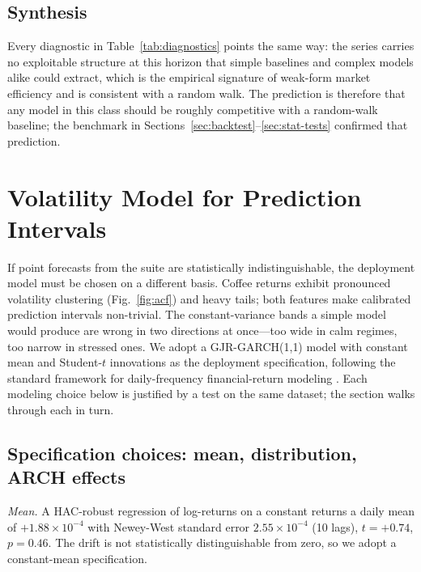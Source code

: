 \documentclass[conference]{IEEEtran}
\begin{document}
\subsection{Synthesis}

Every diagnostic in Table~\ref{tab:diagnostics} points the same way:
the series carries no exploitable structure at this horizon that
simple baselines and complex models alike could extract, which is the
empirical signature of weak-form market efficiency
\cite{fama1970efficient} and is consistent with a random walk. The
prediction is therefore that any model in this class should be
roughly competitive with a random-walk baseline; the benchmark in
Sections~\ref{sec:backtest}--\ref{sec:stat-tests} confirmed that
prediction.

\section{Volatility Model for Prediction Intervals}
\label{sec:garch}

If point forecasts from the suite are statistically indistinguishable,
the deployment model must be chosen on a different basis. Coffee
returns exhibit pronounced volatility clustering (Fig.~\ref{fig:acf})
and heavy tails; both features make calibrated prediction intervals
non-trivial. The constant-variance bands a simple model would produce
are wrong in two directions at once---too wide in calm regimes,
too narrow in stressed ones. We adopt a GJR-GARCH(1{,}1) model with
constant mean and Student-$t$ innovations as the deployment
specification, following the standard framework for daily-frequency
financial-return modeling \cite{tsay2010analysis}. Each modeling
choice below is justified by a test on the same dataset; the section
walks through each in turn.

\subsection{Specification choices: mean, distribution, ARCH effects}

\emph{Mean.} A HAC-robust regression of log-returns on a constant
returns a daily mean of $+1.88 \times 10^{-4}$ with Newey-West
standard error $2.55 \times 10^{-4}$ (10 lags), $t = +0.74$,
$p = 0.46$. The drift is not statistically distinguishable from
zero, so we adopt a constant-mean specification.
\end{document}

